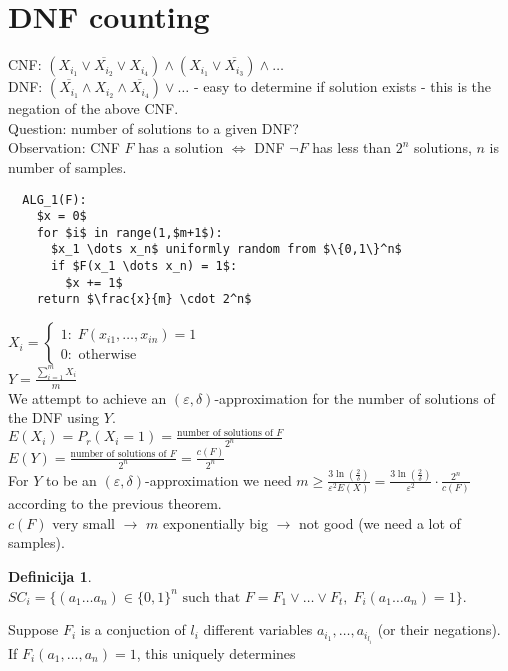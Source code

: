 \documentclass[a4paper, 12pt]{book}
\theoremstyle{definition}
\newtheorem{defn}[counter]{Definicija}
\theoremstyle{remark}
\begin{document}
\section{DNF counting}

CNF: $(X_{i_1} \lor \overline{X_{i_2}} \lor X_{i_4}) \land (X_{i_1} \lor \overline{X_{i_3}}) \land \dots$ \\
DNF: $(\overline{X_{i_1}} \land X_{i_2} \land \overline{X_{i_4}}) \lor \dots$
- easy to determine if solution exists - this is the negation of the above CNF. \\
Question: number of solutions to a given DNF? \\
Observation: CNF $F$ has a solution $\iff$ DNF $\neg F$ has less than $2^n$ solutions, $n$ is number of samples.
\begin{lstlisting}
  ALG_1(F):
    $x = 0$
    for $i$ in range(1,$m+1$):
      $x_1 \dots x_n$ uniformly random from $\{0,1\}^n$
      if $F(x_1 \dots x_n) = 1$:
        $x += 1$
    return $\frac{x}{m} \cdot 2^n$
\end{lstlisting}
$X_i = \begin{cases}
  1: \; F(x_{i1}, \ldots, x_{in}) = 1 \\
  0: \text{ otherwise}
\end{cases}$ \\
$Y = \frac{\sum_{i=1}^{m} X_i}{m}$ \\
We attempt to achieve an $(\varepsilon,\delta)$-approximation for the number of solutions of the DNF using $Y$. \\
$E(X_i) = P_r(X_i = 1) = \frac{\text{number of solutions of }F}{2^n}$ \\
$E(Y) = \frac{\text{number of solutions of }F}{2^n} = \frac{c(F)}{2^n}$ \\
For $Y$ to be an $(\varepsilon,\delta)$-approximation we need $m \geq \frac{3 \ln\left(\frac{2}{\delta}\right)}{\varepsilon^2 E(X)} =
\frac{3 \ln\left(\frac{2}{\delta}\right)}{\varepsilon^2} \cdot \frac{2^n}{c(F)}$ according to the previous theorem. \\
$c(F)$ very small $\to$ $m$ exponentially big $\to$ not good (we need a lot of samples).
\begin{defn} \text{} \\
  $SC_i = \{(a_1 \dots a_n) \in \{0,1\}^n \text{ such that } F = F_1 \lor \dots \lor F_t, \; F_i(a_1 \dots a_n) = 1\}$.
\end{defn}
Suppose $F_i$ is a conjuction of $l_i$ different variables $a_{i_1}, \ldots, a_{i_{l_i}}$ (or their negations). If $F_i(a_1, \ldots, a_n) = 1$, this uniquely determines
\end{document}
